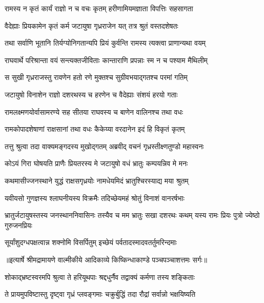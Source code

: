 \twolineshloka
{रामस्य न कृतं कार्यं राज्ञो न च वचः कृतम्}
{हरीणामियमज्ञाता विपत्तिः सहसागता} %

\twolineshloka
{वैदेह्याः प्रियकामेन कृतं कर्म जटायुषा}
{गृध्रराजेन यत् तत्र श्रुतं वस्तदशेषतः} %

\twolineshloka
{तथा सर्वाणि भूतानि तिर्यग्योनिगतान्यपि}
{प्रियं कुर्वन्ति रामस्य त्यक्त्वा प्राणान्यथा वयम्} %

\twolineshloka
{राघवार्थे परिश्रान्ता वयं सन्त्यक्तजीविताः}
{कान्ताराणि प्रपन्नाः स्म न च पश्याम मैथिलीम्} %

\twolineshloka
{स सुखी गृध्रराजस्तु रावणेन हतो रणे}
{मुक्तश्च सुग्रीवभयाद्गतश्च परमां गतिम्} %

\twolineshloka
{जटायुषो विनाशेन राज्ञो दशरथस्य च}
{हरणेन च वैदेह्याः संशयं हरयो गताः} %

\twolineshloka
{रामलक्ष्मणयोर्वासामरण्ये सह सीतया}
{राघवस्य च बाणेन वालिनश्च तथा वधः} %

\twolineshloka
{रामकोपादशेषाणां राक्षसानां तथा वधः}
{कैकेय्या वरदानेन इदं हि विकृतं कृतम्} %

\twolineshloka
{तत्तु श्रुत्वा तदा वाक्यमङ्गदस्य मुखोद्गतम्}
{अब्रवीद् वचनं गृध्रस्तीक्ष्णतुण्डो महास्वनः} %

\twolineshloka
{कोऽयं गिरा घोषयति प्राणैः प्रियतरस्य मे}
{जटायुषो वधं भ्रातुः कम्पयन्निव मे मनः} %

\twolineshloka
{कथमासीज्जनस्थाने युद्धं राक्षसगृध्रयोः}
{नामधेयमिदं भ्रातुश्चिरस्याद्य मया श्रुतम्} %

\twolineshloka
{यवीयसो गुणज्ञस्य श्लाघनीयस्य विक्रमैः}
{तदिच्छेयमहं श्रोतुं विनाशं वानरर्षभाः} %

\threelineshloka
{भ्रातुर्जटायुषस्तस्य जनस्थाननिवासिनः}
{तस्यैव च मम भ्रातुः सखा दशरथः कथम्}
{यस्य रामः प्रियः पुत्रो ज्येष्ठो गुरुजनप्रियः} %

\twolineshloka
{सूर्यांशुदग्धपक्षत्वान्न शक्नोमि विसर्पितुम्}
{इच्छेयं पर्वतादस्मादवतर्तुमरिन्दमाः} %


{॥इत्यार्षे श्रीमद्रामायणे वाल्मीकीये आदिकाव्ये किष्किन्धाकाण्डे पञ्चपञ्चाशत्तमः सर्गः॥}


\twolineshloka
{शोकाद्भ्रष्टस्वरमपि श्रुत्वा ते हरियूथपाः}
{श्रद्दधुर्नैव तद्वाक्यं कर्मणा तस्य शङ्किताः} %

\twolineshloka
{ते प्रायमुपविष्टास्तु दृष्ट्वा गृध्रं प्लवङ्गमाः}
{चक्रुर्बुद्धिं तदा रौद्रां सर्वान्नो भक्षयिष्यति} %

